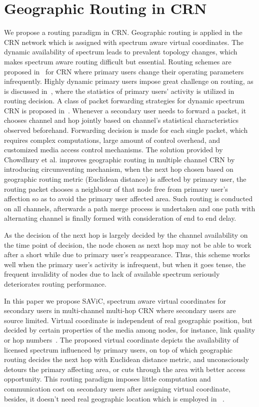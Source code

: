 \section{Geographic Routing in CRN}
We propose a routing paradigm in CRN.
Geographic routing is applied in the CRN network which is assigned with spectrum aware virtual coordinates.
The dynamic availability of spectrum leads to prevalent topology changes, which makes spectrum aware routing difficult but essential.
Routing schemes are proposed in~\cite{Abbagnale_Gymkhana10, caodv-10wd, segment-crowncom08} for CRN where primary users change their operating parameters infrequently.
Highly dynamic primary users impose great challenge on routing, as is discussed in~\cite{Routing-crn-INFOCOM11}, where the statistics of primary users' activity is utilized in routing decision.
A class of packet forwarding strategies for dynamic spectrum CRN is proposed in~\cite{routing-crn-icc11, routing-crn-jsac12}.
Whenever a secondary user needs to forward a packet, it chooses channel and hop jointly based on channel's statistical characteristics observed beforehand.
Forwarding decision is made for each single packet, which requires complex computations, large amount of control overhead, and customized media access control mechanisms.
The solution provided by Chowdhury et al.\cite{search_geo_routing_chowdhury} improves geographic routing in multiple channel CRN by introducing circumventing mechanism, \ie when the next hop chosen based on geographic routing metric (\eg Euclidean distance) is affected by primary user, the routing packet chooses a neighbour of that node free from primary user's affection so as to avoid the primary user affected area.
Such routing is conducted on all channels, afterwards a path merge process is undertaken and one path with alternating channel is finally formed with consideration of end to end delay.

As the decision of the next hop is largely decided by the channel availability on the time point of decision, the node chosen as next hop may not be able to work after a short while due to primary user's reappearance.
Thus, this scheme works well when the primary user's activity is infrequent, but when it goes tense, the frequent invalidity of nodes due to lack of available spectrum seriously deteriorates routing performance.

In this paper we propose SAViC, spectrum aware virtual coordinates for secondary users in multi-channel multi-hop CRN where secondary users are source limited.
Virtual coordinate is independent of real geographic position, but decided by certain properties of the media among nodes, for instance, link quality or hop numbers~\cite{gpsfree05infocom}.
The proposed virtual coordinate depicts the availability of licensed spectrum influenced by primary users, on top of which geographic routing decides the next hop with Euclidean distance metric, and unconsciously detours the primary affecting area, or cuts through the area with better access opportunity.
This routing paradigm imposes little computation and communication cost on secondary users after assigning virtual coordinate, besides, it doesn't need real geographic location which is employed in ~\cite{search_geo_routing_chowdhury, routing-crn-jsac12}.

